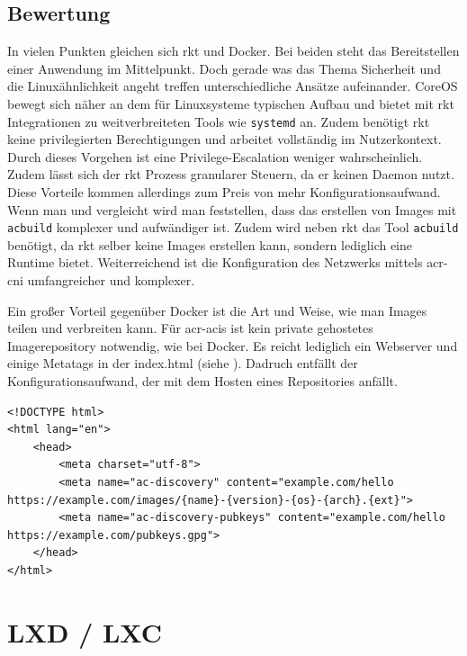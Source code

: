 \subsection{Bewertung}
\label{sec:compRktBewertung}
In vielen Punkten gleichen sich rkt und Docker. Bei beiden steht das Bereitstellen einer Anwendung im Mittelpunkt. Doch gerade was das Thema Sicherheit und die Linuxähnlichkeit angeht treffen unterschiedliche Ansätze aufeinander. CoreOS bewegt sich näher an dem für Linuxsysteme typischen Aufbau und bietet mit rkt Integrationen zu weitverbreiteten Tools wie \texttt{systemd} an. Zudem benötigt rkt keine privilegierten Berechtigungen und arbeitet vollständig im Nutzerkontext. Durch dieses Vorgehen ist eine Privilege-Escalation weniger wahrscheinlich. Zudem lässt sich der rkt Prozess granularer Steuern, da er keinen Daemon nutzt. Diese Vorteile kommen allerdings zum Preis von mehr Konfigurationsaufwand. Wenn man  und  vergleicht wird man feststellen, dass das erstellen von Images mit \texttt{acbuild} komplexer und aufwändiger ist. Zudem wird neben rkt das Tool \texttt{acbuild} benötigt, da rkt selber keine Images erstellen kann, sondern lediglich eine Runtime bietet. Weiterreichend ist die Konfiguration des Netzwerks mittels \gls{acr-cni} umfangreicher und komplexer.

Ein großer Vorteil gegenüber Docker ist die Art und Weise, wie man Images teilen und verbreiten kann. Für \glspl{acr-aci} ist kein private gehostetes Imagerepository notwendig, wie bei Docker. Es reicht lediglich ein Webserver und einige Metatags in der index.html (siehe ). Dadruch entfällt der Konfigurationsaufwand, der mit dem Hosten eines Repositories anfällt.

\begin{listing}
	\begin{verbatim}
<!DOCTYPE html>
<html lang="en">
	<head>
		<meta charset="utf-8">
		<meta name="ac-discovery" content="example.com/hello https://example.com/images/{name}-{version}-{os}-{arch}.{ext}">
		<meta name="ac-discovery-pubkeys" content="example.com/hello https://example.com/pubkeys.gpg">
	</head>
</html>
	\end{verbatim}
	\caption{index.html mit Metatags um \glspl{acr-aci} bereitzustellen}
	\label{lst:rktReposHTML}
\end{listing}

\pagebreak

\section{LXD / LXC}
\label{sec:compLXD}

